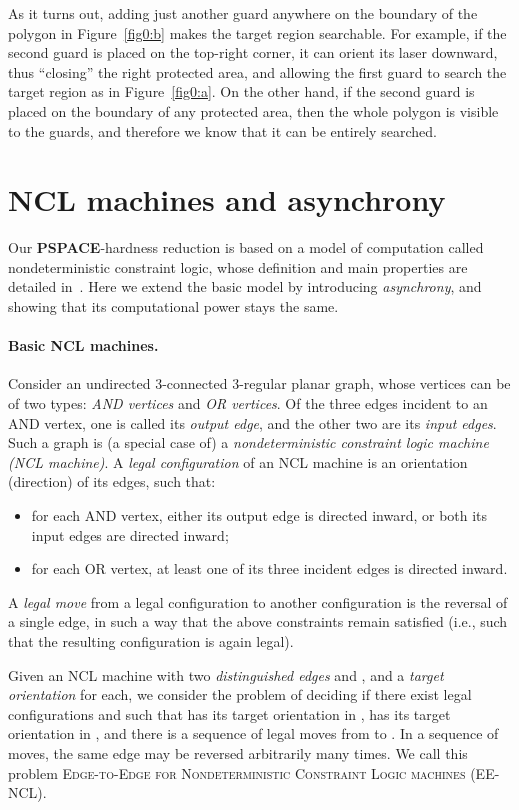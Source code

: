 \documentclass{style}
\newcommand{\complexityclass}[1]{\textbf{#1}}
\newcommand{\computproblem}[1]{\textsc{#1}}
\newcommand{\PSPACE}{\complexityclass{PSPACE}\xspace}
\newcommand{\EENCL}{\computproblem{EE-NCL}\xspace}
\begin{document}
As it turns out, adding just another guard anywhere on the boundary of the polygon in Figure~\ref{fig0:b} makes the target region searchable. For example, if the second guard is placed on the top-right corner, it can orient its laser downward, thus ``closing'' the right protected area, and allowing the first guard to search the target region as in Figure~\ref{fig0:a}. On the other hand, if the second guard is placed on the boundary of any protected area, then the whole polygon is visible to the guards, and therefore we know that it can be entirely searched.

\section{NCL machines and asynchrony} \label{sectionncl}

Our \PSPACE-hardness reduction is based on a model of computation called nondeterministic constraint logic, whose definition and main properties are detailed in~\cite{ncl}. Here we extend the basic model by introducing \emph{asynchrony}, and showing that its computational power stays the same.

\paragraph{Basic NCL machines.}

Consider an undirected 3-connected 3-regular planar graph, whose vertices can be of two types: \emph{AND vertices} and \emph{OR vertices}. Of the three edges incident to an AND vertex, one is called its \emph{output edge}, and the other two are its \emph{input edges}. Such a graph is (a special case of) a \emph{nondeterministic constraint logic machine (NCL machine)}. A \emph{legal configuration} of an NCL machine is an orientation (direction) of its edges, such that:
\begin{itemize}
\item for each AND vertex, either its output edge is directed inward, or both its input edges are directed inward;
\item for each OR vertex, at least one of its three incident edges is directed inward.
\end{itemize}
A \emph{legal move} from a legal configuration to another configuration is the reversal of a single edge, in such a way that the above constraints remain satisfied (i.e., such that the resulting configuration is again legal).

Given an NCL machine with two \emph{distinguished edges}  and , and a \emph{target orientation} for each, we consider the problem of deciding if there exist legal configurations  and  such that  has its target orientation in ,  has its target orientation in , and there is a sequence of legal moves from  to . In a sequence of moves, the same edge may be reversed arbitrarily many times. We call this problem \computproblem{Edge-to-Edge for Nondeterministic Constraint Logic machines} (\EENCL).
\end{document}
